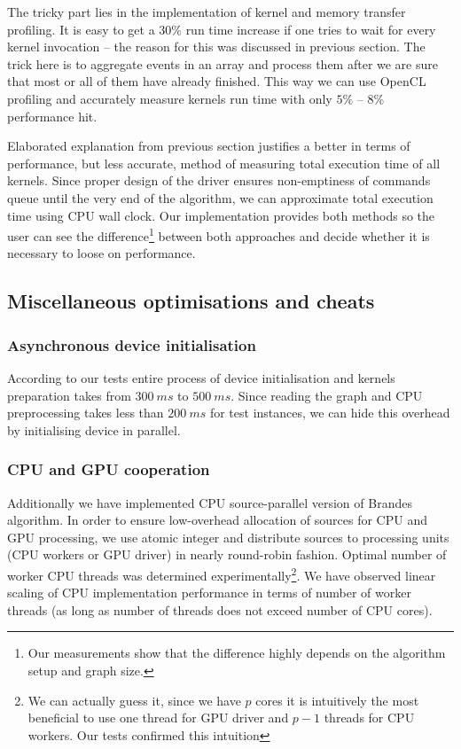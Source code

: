 The tricky part lies in the implementation of kernel and memory transfer profiling.
It is easy to get a $30\%$ run time increase if one tries to wait for every kernel invocation -- the reason for this was discussed in previous section.
The trick here is to aggregate events in an array and process them after we are sure that most or all of them have already finished.
This way we can use OpenCL profiling and accurately measure kernels run time with only $5\%$ -- $8\%$ performance hit.

Elaborated explanation from previous section justifies a better in terms of performance, but less accurate, method of measuring total execution time of all kernels.
Since proper design of the driver ensures non-emptiness of commands queue until the very end of the algorithm, we can approximate total execution time using CPU wall clock.
Our implementation provides both methods so the user can see the difference\footnote{Our measurements show that the difference highly depends on the algorithm setup and graph size.} between both approaches and decide whether it is necessary to loose on performance.

\subsection*{Miscellaneous optimisations and cheats}

\subsubsection*{Asynchronous device initialisation}

According to our tests entire process of device initialisation and kernels preparation takes from $\SI{300}{ms}$ to $\SI{500}{ms}$.
Since reading the graph and CPU preprocessing takes less than $\SI{200}{ms}$ for test instances, we can hide this overhead by initialising device in parallel.

\subsubsection*{CPU and GPU cooperation}

Additionally we have implemented CPU source-parallel version of Brandes algorithm.
In order to ensure low-overhead allocation of sources for CPU and GPU processing, we use atomic integer and distribute sources to processing units (CPU workers or GPU driver) in nearly round-robin fashion.
Optimal number of worker CPU threads was determined experimentally\footnote{We can actually guess it, since we have $p$ cores it is intuitively the most beneficial to use one thread for GPU driver and $p - 1$ threads for CPU workers. Our tests confirmed this intuition}.
We have observed linear scaling of CPU implementation performance in terms of number of worker threads (as long as number of threads does not exceed number of CPU cores).

